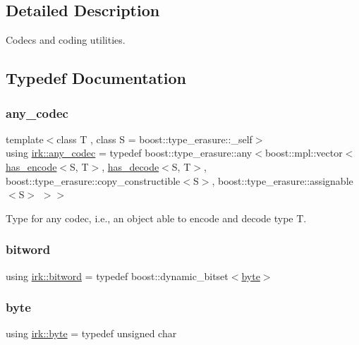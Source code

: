 \subsection{Detailed Description}
Codecs and coding utilities. 

\subsection{Typedef Documentation}
\mbox{\label{namespaceirk_a831a3a869cf19601dbfb5c41765a2e87}} 
\subsubsection{\texorpdfstring{any\+\_\+codec}{any\_codec}}
{\footnotesize\ttfamily template$<$class T , class S  = boost\+::type\+\_\+erasure\+::\+\_\+self$>$ \\
using \mbox{\hyperlink{namespaceirk_a831a3a869cf19601dbfb5c41765a2e87}{irk\+::any\+\_\+codec}} = typedef boost\+::type\+\_\+erasure\+::any$<$boost\+::mpl\+::vector$<$\mbox{\hyperlink{structirk_1_1has__encode}{has\+\_\+encode}}$<$S, T$>$, \mbox{\hyperlink{structirk_1_1has__decode}{has\+\_\+decode}}$<$S, T$>$, boost\+::type\+\_\+erasure\+::copy\+\_\+constructible$<$S$>$, boost\+::type\+\_\+erasure\+::assignable$<$S$>$ $>$$>$}



Type for any codec, i.\+e., an object able to encode and decode type {\ttfamily T}. 

\mbox{\label{namespaceirk_a5d1a67079cf6423ecaededebe848f083}} 
\subsubsection{\texorpdfstring{bitword}{bitword}}
{\footnotesize\ttfamily using \mbox{\hyperlink{namespaceirk_a5d1a67079cf6423ecaededebe848f083}{irk\+::bitword}} = typedef boost\+::dynamic\+\_\+bitset$<$\mbox{\hyperlink{namespaceirk_a332c28497c23c3702c56f3c1c100d028}{byte}}$>$}

\mbox{\label{namespaceirk_a332c28497c23c3702c56f3c1c100d028}} 
\subsubsection{\texorpdfstring{byte}{byte}}
{\footnotesize\ttfamily using \mbox{\hyperlink{namespaceirk_a332c28497c23c3702c56f3c1c100d028}{irk\+::byte}} = typedef unsigned char}

